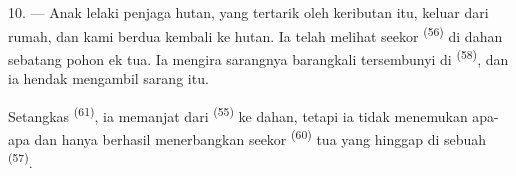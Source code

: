 10. --- Anak lelaki penjaga hutan, yang tertarik oleh keributan
 itu, keluar dari rumah, dan kami berdua
kembali ke hutan. Ia telah melihat seekor 
\textsuperscript{(56)} di dahan sebatang pohon ek tua. Ia mengira
sarangnya barangkali tersembunyi di 
\textsuperscript{(58)}, dan ia hendak mengambil sarang itu.

Setangkas  \textsuperscript{(61)}, ia memanjat dari
 \textsuperscript{(55)} ke dahan, tetapi ia tidak
menemukan apa-apa dan hanya berhasil menerbangkan seekor
 \textsuperscript{(60)} tua yang hinggap di sebuah
 \textsuperscript{(57)}.

\VUsaut{4.0mm}
\VUfilet{22mm}
